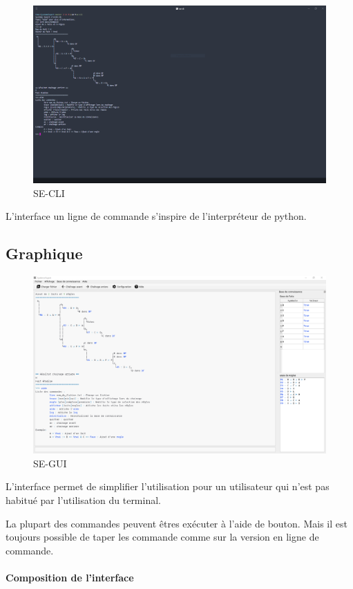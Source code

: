 \documentclass[a4paper, 11pt]{article}
\begin{document}
\begin{figure}[H]
    \centering
    \includegraphics[width=12cm]{cli.png}
    \caption{\label{cli} SE-CLI}
\end{figure}

L'interface un ligne de commande s'inspire de l'interpréteur de python.

\subsection{Graphique}

\begin{figure}[H]
    \centering
    \includegraphics[width=12cm]{gui.png}
    \caption{\label{gui} SE-GUI}
\end{figure}

L'interface permet de simplifier l'utilisation pour un utilisateur qui n'est pas habitué par l'utilisation du terminal.

La plupart des commandes peuvent êtres exécuter à l'aide de bouton. Mais il est toujours possible de taper les commande comme sur la version en ligne de commande.

\paragraph{Composition de l'interface}
\end{document}
